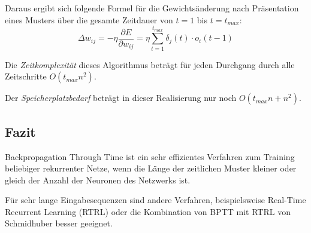 \noindent
Daraus ergibt sich folgende Formel für die Gewichtsänderung nach Präsentation eines Musters über die gesamte Zeitdauer von $t=1$ bis $t=t_{max}$:
\[
	\Delta w_{ij} = - \eta \frac{\partial E}{\partial w_{ij}} =
		\eta \sum_{t=1}^{t_{max}} \delta_j(t) \cdot o_i(t-1)
\]

Die \emph{Zeitkomplexität} dieses Algorithmus beträgt für jeden Durchgang durch alle Zeitschritte $O(t_{max} n^2)$.

Der \emph{Speicherplatzbedarf} beträgt in dieser Realisierung nur noch $O(t_{max} n + n^2)$.

\subsection*{Fazit}
Backpropagation Through Time ist ein sehr effizientes Verfahren zum Training beliebiger rekurrenter Netze, wenn die Länge der zeitlichen Muster kleiner oder gleich der Anzahl der Neuronen des Netzwerks ist.

Für sehr lange Eingabesequenzen sind andere Verfahren, beispielsweise Real-Time Recurrent Learning (RTRL) oder die Kombination von BPTT mit RTRL von Schmidhuber besser geeignet.
